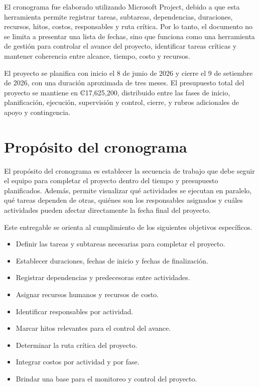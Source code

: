 \documentclass[11pt,spanish]{article}
\begin{document}
El cronograma fue elaborado utilizando Microsoft Project, debido a que esta herramienta permite registrar tareas, subtareas, dependencias, duraciones, recursos, hitos, costos, responsables y ruta crítica. Por lo tanto, el documento no se limita a presentar una lista de fechas, sino que funciona como una herramienta de gestión para controlar el avance del proyecto, identificar tareas críticas y mantener coherencia entre alcance, tiempo, costo y recursos.

El proyecto se planifica con inicio el 8 de junio de 2026 y cierre el 9 de setiembre de 2026, con una duración aproximada de tres meses. El presupuesto total del proyecto se mantiene en ₡17,625,200, distribuido entre las fases de inicio, planificación, ejecución, supervisión y control, cierre, y rubros adicionales de apoyo y contingencia.

\section{Propósito del cronograma}

El propósito del cronograma es establecer la secuencia de trabajo que debe seguir el equipo para completar el proyecto dentro del tiempo y presupuesto planificados. Además, permite visualizar qué actividades se ejecutan en paralelo, qué tareas dependen de otras, quiénes son los responsables asignados y cuáles actividades pueden afectar directamente la fecha final del proyecto.

Este entregable se orienta al cumplimiento de los siguientes objetivos específicos.

\begin{itemize}[leftmargin=*, label={\textbullet}]
    \item Definir las tareas y subtareas necesarias para completar el proyecto.
    \item Establecer duraciones, fechas de inicio y fechas de finalización.
    \item Registrar dependencias y predecesoras entre actividades.
    \item Asignar recursos humanos y recursos de costo.
    \item Identificar responsables por actividad.
    \item Marcar hitos relevantes para el control del avance.
    \item Determinar la ruta crítica del proyecto.
    \item Integrar costos por actividad y por fase.
    \item Brindar una base para el monitoreo y control del proyecto.
\end{itemize}
\end{document}
